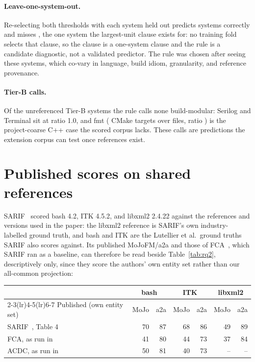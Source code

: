 \documentclass[10pt,conference]{IEEEtran}
\begin{document}
\paragraph{Leave-one-system-out.} Re-selecting both thresholds with each system held out predicts
\rqAdequacyLooCorrect{} systems correctly and misses \rqAdequacyLooWrong{}, the one system the
largest-unit clause exists for: no training fold selects that clause, so the clause is a
one-system clause and the rule is a candidate diagnostic, not a validated predictor. The rule was
chosen after seeing these systems, which co-vary in language, build idiom, granularity, and
reference provenance.

\paragraph{Tier-B calls.} Of the \rqAdequacyTierBSystems{} unreferenced Tier-B systems the rule
calls none build-modular: Serilog and Terminal sit at ratio 1.0, and fmt (\rqAdequacyFmtUnits{}
CMake targets over \rqAdequacyFmtEntities{} files, ratio \rqAdequacyFmtRatio{}) is the
project-coarse C++ case the scored corpus lacks. These calls are predictions the extension corpus
can test once references exist.

\section{Published scores on shared references}
\label{sec:tr-published}

SARIF~\cite{zhang2023sarif} scored bash 4.2, ITK 4.5.2, and libxml2 2.4.22 against the references
and versions used in the paper: the libxml2 reference is SARIF's own industry-labelled ground
truth, and bash and ITK are the Lutellier et al.\ ground truths SARIF also scores against. Its
published MoJoFM/a2a and those of FCA~\cite{teymourian2022fca}, which SARIF ran as a baseline, can
therefore be read beside Table~\ref{tab:rq2}, descriptively only, since they score the authors'
own entity set rather than our all-common projection:

\begin{center}
\footnotesize\setlength{\tabcolsep}{3.5pt}
\begin{tabular}{@{}l rr rr rr@{}}
\toprule
 & \multicolumn{2}{c}{bash} & \multicolumn{2}{c}{ITK} & \multicolumn{2}{c}{libxml2} \\
\cmidrule(lr){2-3}\cmidrule(lr){4-5}\cmidrule(lr){6-7}
Published (own entity set) & MoJo & a2a & MoJo & a2a & MoJo & a2a \\
\midrule
SARIF~\cite{zhang2023sarif}, Table 4 & 70 & 87 & 68 & 86 & 49 & 89 \\
FCA, as run in~\cite{zhang2023sarif} & 41 & 80 & 44 & 73 & 37 & 84 \\
ACDC, as run in~\cite{zhang2023sarif} & 50 & 81 & 40 & 73 & -- & -- \\
\bottomrule
\end{tabular}
\end{center}
\end{document}
